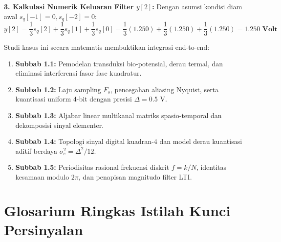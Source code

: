 \documentclass[11pt,a4paper]{article}
\begin{document}
\vspace{0.2cm}
\textbf{3. Kalkulasi Numerik Keluaran Filter $y[2]$:}
Dengan asumsi kondisi diam awal $s_q[-1] = 0, s_q[-2] = 0$:
\begin{equation}
y[2] = \frac{1}{3}s_q[2] + \frac{1}{3}s_q[1] + \frac{1}{3}s_q[0] = \frac{1}{3}(1.250) + \frac{1}{3}(1.250) + \frac{1}{3}(1.250) = \mathbf{1.250\text{ Volt}}
\end{equation}

\vspace{0.3cm}
\begin{tcolorbox}[colback=accent!10, colframe=accent, arc=2mm, title=\textbf{Kesimpulan Grand Synthesis Subbab 1.1 - 1.5}]
Studi kasus ini secara matematis membuktikan integrasi end-to-end:
\begin{enumerate}
  \item \textbf{Subbab 1.1:} Pemodelan transduksi bio-potensial, derau termal, dan eliminasi interferensi fasor fase kuadratur.
  \item \textbf{Subbab 1.2:} Laju sampling $F_s$, pencegahan aliasing Nyquist, serta kuantisasi uniform $4$-bit dengan presisi $\Delta = 0.5\text{ V}$.
  \item \textbf{Subbab 1.3:} Aljabar linear multikanal matriks spasio-temporal dan dekomposisi sinyal elementer.
  \item \textbf{Subbab 1.4:} Topologi sinyal digital kuadran-4 dan model derau kuantisasi aditif berdaya $\sigma_e^2 = \Delta^2/12$.
  \item \textbf{Subbab 1.5:} Periodisitas rasional frekuensi diskrit $f = k/N$, identitas kesamaan modulo $2\pi$, dan penapisan magnitudo filter LTI.
\end{enumerate}
\end{tcolorbox}

\newpage
\section{Glosarium Ringkas Istilah Kunci Persinyalan}
\end{document}
